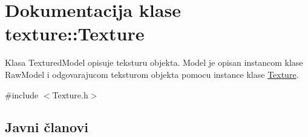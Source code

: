 \hypertarget{classtexture_1_1Texture}{}\section{Dokumentacija klase texture\+:\+:Texture}
\label{classtexture_1_1Texture}


Klasa Textured\+Model opisuje teksturu objekta. Model je opisan instancom klase Raw\+Model i odgovarajucom teksturom objekta pomocu instance klase \hyperlink{classtexture_1_1Texture}{Texture}.  




{\ttfamily \#include $<$Texture.\+h$>$}

\subsection*{Javni članovi}
